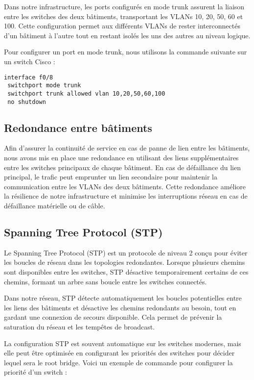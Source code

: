 \documentclass[a4paper,12pt]{report}
\begin{document}
                Dans notre infrastructure, les ports configurés en mode trunk assurent la liaison entre les switches des deux bâtiments, transportant les VLANs 10, 20, 50, 60 et 100. Cette configuration permet aux différents VLANs de rester interconnectés d'un bâtiment à l'autre tout en restant isolés les uns des autres au niveau logique. 

                Pour configurer un port en mode trunk, nous utilisons la commande suivante sur un switch Cisco :

                \begin{verbatim}
interface f0/8
 switchport mode trunk
 switchport trunk allowed vlan 10,20,50,60,100
 no shutdown
                \end{verbatim}

            \subsection{Redondance entre bâtiments}
                Afin d'assurer la continuité de service en cas de panne de lien entre les bâtiments, nous avons mis en place une redondance en utilisant des liens supplémentaires entre les switches principaux de chaque bâtiment. En cas de défaillance du lien principal, le trafic peut emprunter un lien secondaire pour maintenir la communication entre les VLANs des deux bâtiments. Cette redondance améliore la résilience de notre infrastructure et minimise les interruptions réseau en cas de défaillance matérielle ou de câble.

            \subsection{Spanning Tree Protocol (STP)}
                Le Spanning Tree Protocol (STP) est un protocole de niveau 2 conçu pour éviter les boucles de réseau dans les topologies redondantes. Lorsque plusieurs chemins sont disponibles entre les switches, STP désactive temporairement certains de ces chemins, formant un arbre sans boucle entre les switches connectés. 

                Dans notre réseau, STP détecte automatiquement les boucles potentielles entre les liens des bâtiments et désactive les chemins redondants au besoin, tout en gardant une connexion de secours disponible. Cela permet de prévenir la saturation du réseau et les tempêtes de broadcast.

                La configuration STP est souvent automatique sur les switches modernes, mais elle peut être optimisée en configurant les priorités des switches pour décider lequel sera le root bridge. Voici un exemple de commande pour configurer la priorité d'un switch :
\end{document}
